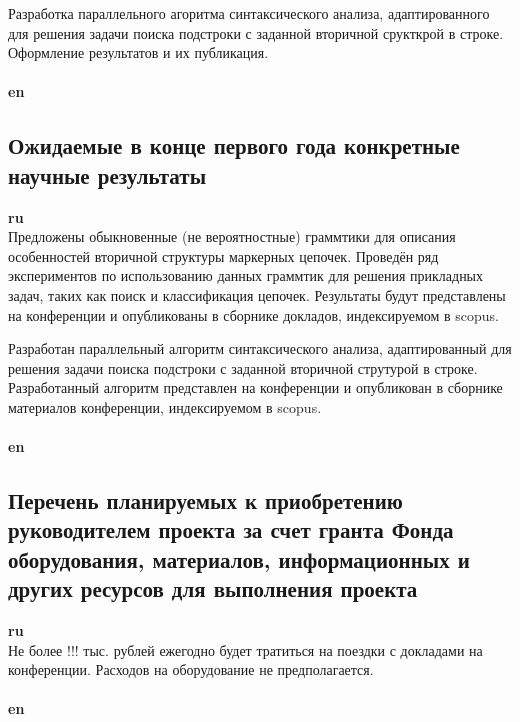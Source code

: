 \documentclass[12pt]{article}  %
\theoremstyle{remark}
\begin{document}
Разработка параллельного агоритма синтаксического анализа, адаптированного для решения задачи поиска подстроки с заданной вторичной срукткрой в строке.
Оформление результатов и их публикация.
\\
\\
\textbf{en}\\

\subsection{Ожидаемые в конце первого года конкретные научные результаты}

\textbf{ru}\\
Предложены обыкновенные (не вероятностные) граммтики для описания особенностей вторичной структуры маркерных цепочек.
Проведён ряд экспериментов по использованию данных граммтик для решения прикладных задач, таких как поиск и классификация цепочек.
Результаты будут представлены на конференции и опубликованы в сборнике докладов, индексируемом в scopus.

Разработан параллельный алгоритм синтаксического анализа, адаптированный для решения задачи поиска подстроки с заданной вторичной струтурой в строке.
Разработанный алгоритм представлен на конференции и опубликован в сборнике материалов конференции, индексируемом в scopus.
\\
\\
\textbf{en}\\

\subsection{Перечень планируемых к приобретению руководителем проекта за счет гранта Фонда оборудования, материалов, информационных и других ресурсов для выполнения проекта}

\textbf{ru}\\
Не более !!! тыс. рублей ежегодно будет тратиться на поездки с докладами на конференции. Расходов на оборудование не предполагается.
\\
\\
\textbf{en}\\
\end{document}
